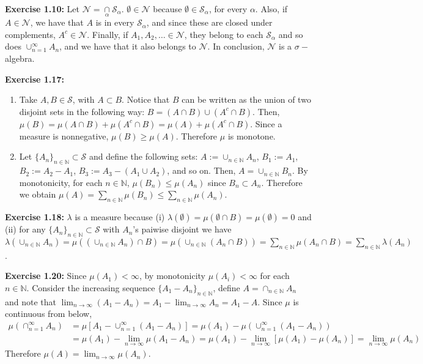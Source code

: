 \documentclass[11.5pt, letterpaper, bibtotoc,
    tablecaptionabove, figurecaptionabove]{article}
\begin{document}
\textbf{Exercise 1.10:}
Let $\mathcal N = \underset{\alpha}{\cap}\mathcal S_\alpha$.
$\emptyset\in\mathcal N$ because $\emptyset\in\mathcal S_\alpha$, for every $\alpha$.
Also, if $A\in\mathcal N$, we have that $A$ is in every $\mathcal S_\alpha$,
and since these are closed under complements, $A^c\in\mathcal N$.
Finally, if $A_1, A_2,\ldots\in\mathcal N$, they belong to each $\mathcal S_\alpha$ and so does 
$\cup_{n=1}^\infty A_n$, and we have that it also belongs to $\mathcal N$.
In conclusion, $\mathcal N$ is a $\sigma-$algebra.

\textbf{Exercise 1.17:}
\begin{enumerate}
\item
Take $A,B\in\mathcal S$, with $A\subset B$.
Notice that $B$ can be written as the union of two disjoint sets in the following way: 
$B = (A\cap B) \cup (A^c\cap B)$.
Then, $\mu(B)=\mu(A\cap B) + \mu(A^c\cap B) = \mu(A) + \mu(A^c\cap B)$.
Since a measure is nonnegative, $\mu(B)\geq\mu(A)$.
Therefore $\mu$ is monotone.

\item
Let $\{A_n\}_{n\in\mathbb N}\subset\mathcal S$ and define the following sets: $A := \cup_{n\in\mathbb N} A_n$,
$B_1 := A_1$, $B_2 := A_2-A_1$, $B_3 := A_3-(A_1\cup A_2)$, and so on.
Then, $A = \cup_{n\in\mathbb N} B_n$.
By monotonicity, for each $n\in\mathbb N$, $\mu(B_n)\leq\mu(A_n)$ since $B_n\subset A_n$.
Therefore we obtain $\mu(A)=\sum_{n\in\mathbb N}\mu(B_n)\leq \sum_{n\in\mathbb N}\mu(A_n)$.
\end{enumerate}

\textbf{Exercise 1.18:}
$\lambda$ is a measure because (i) $\lambda(\emptyset) = \mu(\emptyset\cap B) = \mu(\emptyset) = 0$
and (ii) for any $\{A_n\}_{n\in\mathbb N}\subset\mathcal S$ with $A_n$'s paiwise disjoint we have
$\lambda(\cup_{n\in\mathbb N} A_n) = \mu\left((\cup_{n\in\mathbb N} A_n) \cap B\right) =
\mu\left(\cup_{n\in\mathbb N} (A_n \cap B)\right) = \sum_{n\in\mathbb N}\mu(A_n\cap B) = \sum_{n\in\mathbb N}\lambda(A_n)$.

\textbf{Exercise 1.20:}
Since $\mu(A_1)<\infty$, by monotonicity $\mu(A_i)<\infty$ for each $n\in\mathbb N$.
Consider the increasing sequence $\{A_1-A_n\}_{n\in\mathbb N}$,
define $A=\cap_{n\in\mathbb N} A_n$
and note that $\lim_{n\to\infty}(A_1-A_n) = A_1-\lim_{n\to\infty}A_n = A_1-A$.
Since $\mu$ is continuous from below,
\begin{align*}
\mu (\cap_{n=1}^\infty A_n ) & = \mu[A_1 - \cup_{n=1}^\infty (A_1 - A_n) ] = 
    \mu(A_1) - \mu(\cup_{n=1}^\infty (A_1 - A_n))\\
& = \mu(A_1) - \lim_{n \to \infty} \mu(A_1 - A_n) = 
    \mu(A_1) - \lim_{n \to \infty} [\mu(A_1) - \mu(A_n)]  = \lim_{n \to \infty} \mu(A_n)
\end{align*}
Therefore $\mu(A)=\lim_{n\to\infty}\mu(A_n)$.
\end{document}
